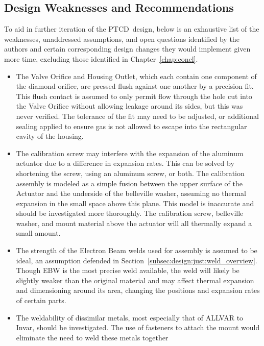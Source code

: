 \documentclass[12pt, letterpaper]{report}%
\newcounter{mycounter}           %
\newcounter{sub}[mycounter]      %
\newcommand{\device}{PTCD}
\begin{document}
\begin{appendices}
	 	

		\newpage

	\section{Design Weaknesses and Recommendations}
	\label{app:iter:weak}

		To aid in further iteration of the \device\ design, below is an exhaustive list of the weaknesses, unaddressed assumptions, and open questions
		identified by the authors and certain corresponding design changes they would implement given more time, excluding those identified in Chapter~\ref{chap:concl}.

		\begin{itemize}
			\item The Valve Orifice and Housing Outlet, which each contain one component of the diamond orifice, are pressed flush against one another by a precision fit.
				This flush contact is assumed to only permit flow through the hole cut into the Valve Orifice without allowing leakage around its sides, but this was never verified.
				The tolerance of the fit may need to be adjusted, or additional sealing applied to ensure gas is not allowed to escape into the rectangular cavity of the housing.
			\item The calibration screw may interfere with the expansion of the aluminum actuator due to a difference in expansion rates. This can be solved by shortening the screw, using an aluminum screw, or both.
				The calibration assembly is modeled as a simple fusion between the upper surface of the Actuator and the underside of the belleville washer, assuming no thermal expansion in the small space above this plane.
				This model is inaccurate and should be investigated more thoroughly. The calibration screw, belleville washer, and mount material above the actuator will all thermally expand a small amount.
			\item The strength of the Electron Beam welds used for assembly is assumed to be ideal, an assumption defended in Section~\ref{subsec:design:just:weld_overview}. Though EBW is the most precise weld available, the weld will likely
				be slightly weaker than the original material and may affect thermal expansion and dimensioning around its area, changing the positions and expansion rates of certain parts.
			\item The weldability of dissimilar metals, most especially that of ALLVAR to Invar, should be investigated. The use of fasteners to attach the mount would eliminate the need to weld these metals together

\end{itemize}
\end{appendices}
\end{document}
